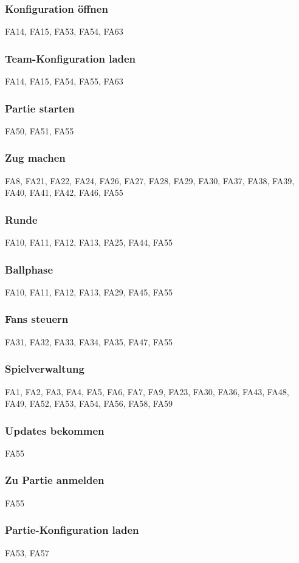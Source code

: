 \subsubsection{Konfiguration öffnen}
FA14,
FA15, 
FA53, 
FA54, 
FA63

\subsubsection{Team-Konfiguration laden}
FA14,
FA15, 
FA54, 
FA55, 
FA63

\subsubsection{Partie starten}
FA50,
FA51, 
FA55

\subsubsection{Zug machen}
FA8,
FA21, 
FA22, 
FA24, 
FA26, 
FA27, 
FA28, 
FA29, 
FA30, 
FA37, 
FA38, 
FA39, 
FA40, 
FA41, 
FA42, 
FA46, 
FA55

\subsubsection{Runde}
FA10,
FA11, 
FA12, 
FA13, 
FA25, 
FA44, 
FA55

\subsubsection{Ballphase}
FA10,
FA11, 
FA12, 
FA13, 
FA29, 
FA45, 
FA55 

\subsubsection{Fans steuern}
FA31,
FA32, 
FA33, 
FA34, 
FA35, 
FA47, 
FA55 

\subsubsection{Spielverwaltung}
FA1,
FA2, 
FA3, 
FA4, 
FA5, 
FA6, 
FA7, 
FA9, 
FA23, 
FA30, 
FA36, 
FA43, 
FA48, 
FA49, 
FA52, 
FA53, 
FA54, 
FA56, 
FA58, 
FA59 

\subsubsection{Updates bekommen}
FA55

\subsubsection{Zu Partie anmelden}
FA55

\subsubsection{Partie-Konfiguration laden}
FA53,
FA57
